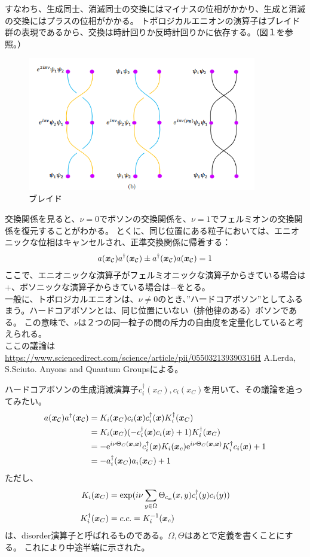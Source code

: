 \documentclass[a4paper,11pt]{jsarticle}
\numberwithin{equation}{section}
\begin{document}
すなわち、生成同士、消滅同士の交換にはマイナスの位相がかかり、生成と消滅の交換にはプラスの位相がかかる。
トポロジカルエニオンの演算子はブレイド群の表現であるから、交換は時計回りか反時計回りかに依存する。（図１を参照。）
\begin{figure}[htbp]
\begin{center}
\includegraphics[width=100mm]{braidwf.png}
\caption{ブレイド}
\end{center}
\end{figure}

交換関係を見ると、$\nu=0$でボソンの交換関係を、$\nu=1$でフェルミオンの交換関係を復元することがわかる。
とくに、同じ位置にある粒子においては、エニオニックな位相はキャンセルされ、正準交換関係に帰着する：
\begin{align}
  a(\vb*{x}_\mathcal{C})a^{\dag}(\vb*{x}_\mathcal{C})\pm a^{\dag}(\vb*{x}_\mathcal{C})a(\vb*{x}_\mathcal{C})=1\\
\end{align}
ここで、エニオニックな演算子がフェルミオニックな演算子からきている場合は+、ボソニックな演算子からきている場合は$-$をとる。\\
一般に、トポロジカルエニオンは、$\nu\neq0$のとき、”ハードコアボソン”としてふるまう。ハードコアボソンとは、同じ位置にいない（排他律のある）ボソンである。
この意味で、$\nu$は２つの同一粒子の間の斥力の自由度を定量化していると考えられる。\\
ここの議論は\url{https://www.sciencedirect.com/science/article/pii/055032139390316H}{ A.Lerda, S.Sciuto. Anyons and Quantum Groups}による。

ハードコアボソンの生成消滅演算子$c_i^{\dag}(x_C),c_i(x_C)$を用いて、その議論を追ってみたい。
\begin{align}
  a(\vb*{x}_\mathcal{C})a^{\dag}(\vb*{x}_\mathcal{C})&=K_i(\vb*{x}_C)c_i(\vb*{x})c_i^{\dag}(\vb*{x})K_i^{\dag}(\vb*{x}_C)\\
  &=K_i(\vb*{x}_C)(-c_i^{\dag}(\vb*{x})c_i(\vb*{x})+1)K_i^{\dag}(\vb*{x}_C)\\
  &=-\mathrm{e}^{i\nu\Theta_C(\vb*{x},\vb*{x})}c_i^{\dag}(\vb*{x})K_i(\vb*{x}_c)\mathrm{e}^{i\nu\Theta_C(\vb*{x},\vb*{x})}K_i^{\dag}c_i(\vb*{x})+1\\
  &=-a_i^{\dag}(\vb*{x}_C)a_i(\vb*{x}_C)+1
\end{align}
ただし、
\begin{align}
 K_i(\vb*{x}_C)&=\mathrm{exp}(i\nu\sum_{y\in\Omega}\Theta_{c_{\vb*{x}}}(x,y)c_i^{\dag}(y)c_i(y))\\
K_i^{\dag}(\vb*{x}_C)&=c.c.=K_i^{-1}(\vb*{x}_c)
\end{align}
は、disorder演算子と呼ばれるものである。$\Omega,\Theta$はあとで定義を書くことにする。
これにより中途半端に示された。
\end{document}
